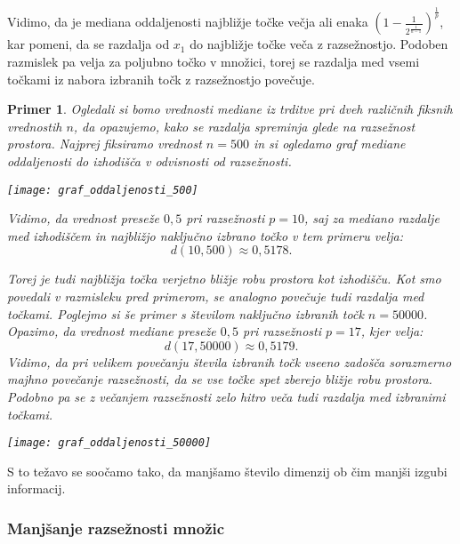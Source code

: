 \documentclass[12pt,a4paper]{article}
\newtheorem{primer}{Primer}
\begin{document}
Vidimo, da je mediana oddaljenosti najbližje točke večja ali enaka $(1 - \frac{1}{2^{\frac{1}{n-1}}})^{\frac{1}{p}}$, kar pomeni, 
da se razdalja od $x_1$ do najbližje točke veča z razsežnostjo. 
Podoben razmislek pa velja za poljubno točko v množici, torej se razdalja med vsemi točkami iz nabora izbranih točk z razsežnostjo povečuje.

\begin{primer}
Ogledali si bomo vrednosti mediane iz trditve pri dveh različnih fiksnih vrednostih $n$, da opazujemo, kako se razdalja spreminja glede na razsežnost prostora. Najprej fiksiramo vrednost $n=500$ in si ogledamo graf mediane oddaljenosti do izhodišča v odvisnosti od razsežnosti.

\begin{center}
\texttt{[image: graf\_oddaljenosti\_500]}
\end{center}

Vidimo, da vrednost preseže $0,5$ pri razsežnosti $p=10$, saj za mediano razdalje med izhodiščem in najbližjo naključno izbrano točko v tem primeru velja:
\[
d(10,500) \approx 0,5178.
\]

Torej je tudi najbližja točka verjetno bližje robu prostora kot izhodišču. 
Kot smo povedali v razmisleku pred primerom, se analogno povečuje tudi razdalja med točkami. 
Poglejmo si še primer s številom naključno izbranih točk $n=50000$. Opazimo, da vrednost mediane preseže $0,5$ pri razsežnosti $p=17$, kjer velja:
\[
d(17,50000) \approx 0,5179.
\]
Vidimo, da pri velikem povečanju števila izbranih točk vseeno zadošča sorazmerno majhno povečanje razsežnosti, da se vse točke spet zberejo bližje robu prostora. 
Podobno pa se z večanjem razsežnosti zelo hitro veča tudi razdalja med izbranimi točkami.

\begin{center}
\texttt{[image: graf\_oddaljenosti\_50000]}
\end{center}

\end{primer}

S to težavo se soočamo tako, da manjšamo število dimenzij ob čim manjši izgubi informacij.


\subsubsection{Manjšanje razsežnosti množic}
\end{document}
